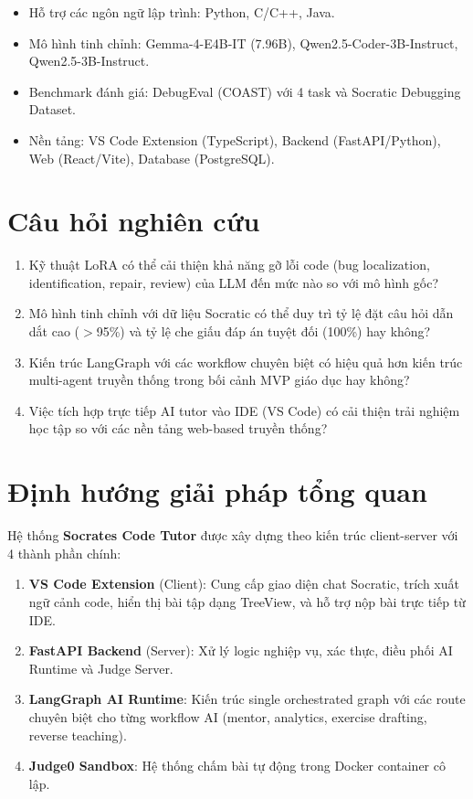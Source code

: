\begin{itemize}
    \item Hỗ trợ các ngôn ngữ lập trình: Python, C/C++, Java.
    \item Mô hình tinh chỉnh: Gemma-4-E4B-IT (7.96B), Qwen2.5-Coder-3B-Instruct, Qwen2.5-3B-Instruct.
    \item Benchmark đánh giá: DebugEval (COAST) với 4 task và Socratic Debugging Dataset.
    \item Nền tảng: VS Code Extension (TypeScript), Backend (FastAPI/Python), Web (React/Vite), Database (PostgreSQL).
\end{itemize}

\section{Câu hỏi nghiên cứu}

\begin{enumerate}
    \item Kỹ thuật LoRA có thể cải thiện khả năng gỡ lỗi code (bug localization, identification, repair, review) của LLM đến mức nào so với mô hình gốc?
    \item Mô hình tinh chỉnh với dữ liệu Socratic có thể duy trì tỷ lệ đặt câu hỏi dẫn dắt cao ($>$95\%) và tỷ lệ che giấu đáp án tuyệt đối (100\%) hay không?
    \item Kiến trúc LangGraph với các workflow chuyên biệt có hiệu quả hơn kiến trúc multi-agent truyền thống trong bối cảnh MVP giáo dục hay không?
    \item Việc tích hợp trực tiếp AI tutor vào IDE (VS Code) có cải thiện trải nghiệm học tập so với các nền tảng web-based truyền thống?
\end{enumerate}

\section{Định hướng giải pháp tổng quan}

Hệ thống \textbf{Socrates Code Tutor} được xây dựng theo kiến trúc client-server với 4 thành phần chính:

\begin{enumerate}
    \item \textbf{VS Code Extension} (Client): Cung cấp giao diện chat Socratic, trích xuất ngữ cảnh code, hiển thị bài tập dạng TreeView, và hỗ trợ nộp bài trực tiếp từ IDE.
    \item \textbf{FastAPI Backend} (Server): Xử lý logic nghiệp vụ, xác thực, điều phối AI Runtime và Judge Server.
    \item \textbf{LangGraph AI Runtime}: Kiến trúc single orchestrated graph với các route chuyên biệt cho từng workflow AI (mentor, analytics, exercise drafting, reverse teaching).
    \item \textbf{Judge0 Sandbox}: Hệ thống chấm bài tự động trong Docker container cô lập.
\end{enumerate}

